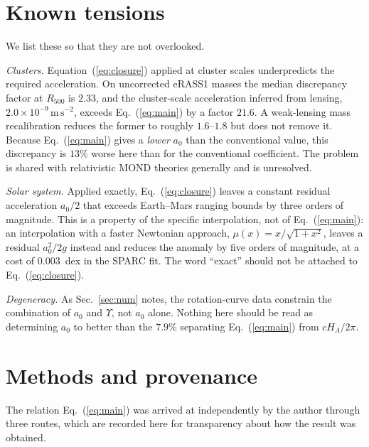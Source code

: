 \documentclass[11pt]{article}
\begin{document}
\section{Known tensions}

We list these so that they are not overlooked.

\emph{Clusters.} Equation~(\ref{eq:closure}) applied at cluster scales underpredicts the required
acceleration. On uncorrected eRASS1 masses the median discrepancy factor at $R_{500}$ is $2.33$, and the
cluster-scale acceleration inferred from lensing, $2.0\times10^{-9}\,\mathrm{m\,s^{-2}}$, exceeds
Eq.~(\ref{eq:main}) by a factor $21.6$. A weak-lensing mass recalibration reduces the former to roughly
$1.6$--$1.8$ but does not remove it. Because Eq.~(\ref{eq:main}) gives a \emph{lower} $a_0$ than the
conventional value, this discrepancy is $13\%$ worse here than for the conventional coefficient. The
problem is shared with relativistic MOND theories generally and is unresolved.

\emph{Solar system.} Applied exactly, Eq.~(\ref{eq:closure}) leaves a constant residual acceleration
$a_0/2$ that exceeds Earth--Mars ranging bounds by three orders of magnitude. This is a property of the
specific interpolation, not of Eq.~(\ref{eq:main}): an interpolation with a faster Newtonian approach,
$\mu(x) = x/\sqrt{1+x^2}$, leaves a residual $a_0^2/2g$ instead and reduces the anomaly by five orders
of magnitude, at a cost of $0.003$~dex in the SPARC fit. The word ``exact'' should not be attached to
Eq.~(\ref{eq:closure}).

\emph{Degeneracy.} As Sec.~\ref{sec:num} notes, the rotation-curve data constrain the combination of
$a_0$ and $\Upsilon$, not $a_0$ alone. Nothing here should be read as determining $a_0$ to better than
the $7.9\%$ separating Eq.~(\ref{eq:main}) from $cH_\Lambda/2\pi$.

\section{Methods and provenance}

The relation Eq.~(\ref{eq:main}) was arrived at independently by the author through three routes, which
are recorded here for transparency about how the result was obtained.
\end{document}
